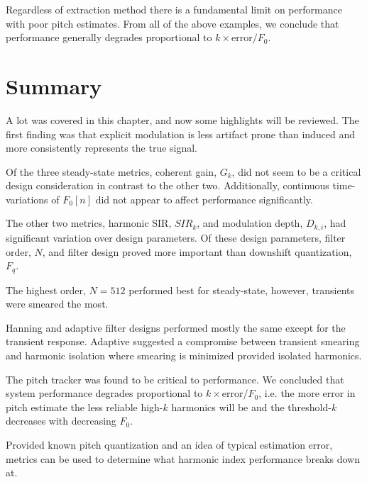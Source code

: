 \documentclass [11pt, proquest,oneside] {ganter_thesis}[2015/03/03]
\begin{document}
Regardless of extraction method there is a fundamental limit on performance with poor pitch estimates.  From all of the above examples, we conclude that performance generally degrades proportional to $k \times \mathrm{error} / F_0$.

\section{Summary}

A lot was covered in this chapter, and now some highlights will be reviewed.  The first finding was that explicit modulation is less artifact prone than induced and more consistently represents the true signal.

Of the three steady-state metrics, coherent gain, $G_k$, did not seem to be a critical design consideration in contrast to the other two.  Additionally, continuous time-variations of $F_0[n]$ did not appear to affect performance significantly.

The other two metrics, harmonic SIR, $SIR_k$, and modulation depth, $D_{k,i}$, had significant variation over design parameters.  Of these design parameters, filter order, $N$, and filter design proved more important than downshift quantization, $F_q$.

The highest order, $N = 512$ performed best for steady-state, however, transients were smeared the most.

Hanning and adaptive filter designs performed mostly the same except for the transient response.  Adaptive suggested a compromise between transient smearing and harmonic isolation where smearing is minimized provided isolated harmonics.

The pitch tracker was found to be critical to performance.  We concluded that system performance degrades proportional to $k \times \mathrm{error} / F_0$, i.e. the more error in pitch estimate the less reliable high-$k$ harmonics will be and the threshold-$k$ decreases with decreasing $F_0$.

Provided known pitch quantization and an idea of typical estimation error, metrics can be used to determine what harmonic index performance breaks down at.


\end{document}
